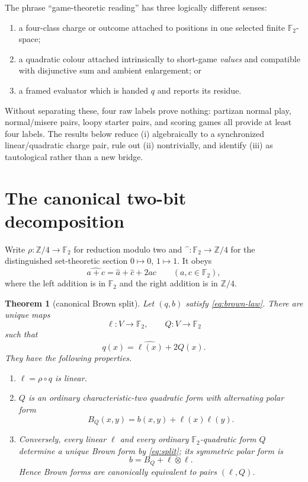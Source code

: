 \documentclass[11pt]{article}
\newtheorem{theorem}{Theorem}
\theoremstyle{definition}
\theoremstyle{remark}
\newcommand{\Z}{\mathbb Z}
\newcommand{\F}{\mathbb F}
\begin{document}
The phrase ``game-theoretic reading'' has three logically different senses:
\begin{enumerate}[label=(\roman*),leftmargin=2.5em]
\item a four-class charge or outcome attached to positions in one selected
      finite $\F_2$-space;
\item a quadratic colour attached intrinsically to short-game \emph{values}
      and compatible with disjunctive sum and ambient enlargement; or
\item a framed evaluator which is handed $q$ and reports its residue.
\end{enumerate}
Without separating these, four raw labels prove nothing: partizan normal play,
normal/misere pairs, loopy starter pairs, and scoring games all provide at
least four labels.  The results below reduce (i) algebraically to a
synchronized linear/quadratic charge pair, rule out (ii) nontrivially, and
identify (iii) as tautological rather than a new bridge.

\section{The canonical two-bit decomposition}

Write $\rho:\Z/4\to\F_2$ for reduction modulo two and
$\widehat{\phantom a}:\F_2\to\Z/4$ for the distinguished set-theoretic
section $0\mapsto0$, $1\mapsto1$.  It obeys
\begin{equation}\label{eq:carry}
 \widehat{a+c}=\widehat a+\widehat c+2ac
 \qquad(a,c\in\F_2),
\end{equation}
where the left addition is in $\F_2$ and the right addition is in $\Z/4$.

\begin{theorem}[canonical Brown split]\label{thm:split}
Let $(q,b)$ satisfy \eqref{eq:brown-law}.  There are unique maps
\[
 \ell:V\to\F_2,
 \qquad
 Q:V\to\F_2
\]
such that
\begin{equation}\label{eq:split}
 q(x)=\widehat{\ell(x)}+2Q(x).
\end{equation}
They have the following properties.
\begin{enumerate}[label=(\roman*),leftmargin=2.5em]
\item $\ell=\rho\circ q$ is linear.
\item $Q$ is an ordinary characteristic-two quadratic form with alternating
      polar form
      \begin{equation}\label{eq:new-polar}
       B_Q(x,y)=b(x,y)+\ell(x)\ell(y).
      \end{equation}
\item Conversely, every linear $\ell$ and every ordinary $\F_2$-quadratic
      form $Q$ determine a unique Brown form by \eqref{eq:split}; its symmetric
      polar form is
      \[
       b=B_Q+\ell\otimes\ell.
      \]
Hence Brown forms are canonically equivalent to pairs $(\ell,Q)$.
\end{enumerate}
\end{theorem}
\end{document}
